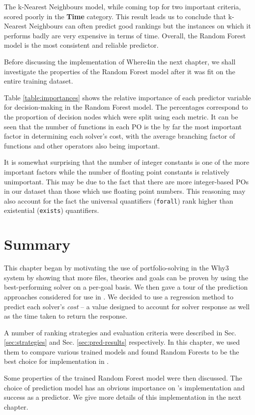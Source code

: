 The k-Nearest Neighbours model, while coming top for two important criteria, scored poorly in the \textbf{Time} category.
This result leads us to conclude that k-Nearest Neighbours can often predict good rankings but the instances on which it performs badly are very expensive in terms of time.
Overall, the Random Forest model is the most consistent and reliable predictor.

Before discussing the implementation of \textsf{Where4}in the next chapter, we shall investigate the properties of the Random Forest model after it was fit on the entire training dataset.

Table \ref{table:importances} shows the relative importance of each predictor variable for decision-making in the Random Forest model. 
The percentages correspond to the proportion of decision nodes which were split using each metric.
It can be seen that the number of functions in each PO is the by far the most important factor in determining each solver's cost, with the average branching factor of functions and other operators also being important.

It is somewhat surprising that the number of integer constants is one of the more important factors while the number of floating point constants is relatively unimportant.
This may be due to the fact that there are more integer-based POs in our dataset than those which use floating point numbers.
This reasoning may also account for the fact the universal quantifiers (\texttt{forall}) rank higher than existential (\texttt{exists}) quantifiers.



\section{Summary}

This chapter began by motivating the use of portfolio-solving in the \textsf{Why3} system by showing that more files, theories and goals can be proven by using the best-performing solver on a per-goal basis.
We then gave a tour of the prediction approaches considered for use in \where.
We decided to use a regression method to predict each solver's \textit{cost} -- a value designed to account for solver response as well as the time taken to return the response. 

A number of ranking strategies and evaluation criteria were described in Sec. \ref{sec:strategies} and Sec. \ref{sec:pred-results} respectively.
In this chapter, we used them to compare various trained models and found Random Forests to be the best choice for implementation in \where.

Some properties of the trained Random Forest model were then discussed.
The choice of prediction model has an obvious importance on \where's  implementation and success as a predictor. 
We give more details of this implementation in the next chapter.  



